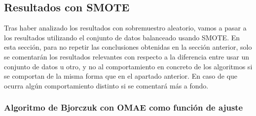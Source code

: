\subsection{Resultados con SMOTE}

Tras haber analizado los resultados con sobremuestro aleatorio, vamos a pasar a los resultados utilizando el conjunto de datos balanceado usando SMOTE. En esta sección, para no repetir las conclusiones obtenidas en la sección anterior, solo se comentarán los resultados relevantes con respecto a la diferencia entre usar un conjunto de datos u otro, y no al comportamiento en concreto de los algoritmos si se comportan de la misma forma que en el apartado anterior. En caso de que ocurra algún comportamiento distinto si se comentará más a fondo.


\subsubsection{Algoritmo de Bjorczuk con OMAE como función de ajuste}

